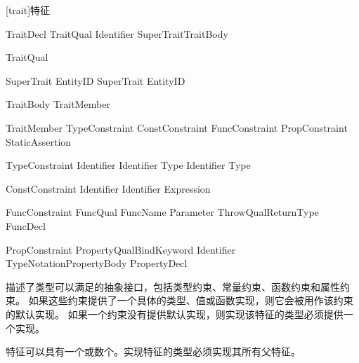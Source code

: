 
[trait]{特征}

\begin{bnf}{TraitDecl}
    TraitQual\bnfs {} Identifier SuperTrait\bnfq TraitBody
\end{bnf}

\begin{bnf}{TraitQual}
\end{bnf}

\begin{bnf}{SuperTrait}
    \terminal{:} EntityID \br
    SuperTrait \terminal{,} EntityID
\end{bnf}

\begin{bnf}{TraitBody}
    \terminal{\{} TraitMember\bnfs \terminal{\}}
\end{bnf}

\begin{bnf}{TraitMember}
    TypeConstraint \br
    ConstConstraint \br
    FuncConstraint \br
    PropConstraint \br
    StaticAssertion
\end{bnf}

\begin{bnf}{TypeConstraint}
     Identifier \terminal{;} \br
     Identifier \terminal{:} Type \terminal{;} \br
     Identifier \terminal{=} Type \terminal{;}
\end{bnf}

\begin{bnf}{ConstConstraint}
     Identifier \terminal{;} \br
     Identifier \terminal{=} Expression \terminal{;}
\end{bnf}

\begin{bnf}{FuncConstraint}
    FuncQual\bnfs {} FuncName Parameter ThrowQual\bnfq ReturnType \terminal{;} \br
    FuncDecl
\end{bnf}

\begin{bnf}{PropConstraint}
    PropertyQual\bnfs BindKeyword Identifier TypeNotation\bnfq PropertyBody \terminal{;} \br
    PropertyDecl
\end{bnf}

\pnum
{}描述了类型可以满足的抽象接口，包括类型约束、常量约束、函数约束和属性约束。
如果这些约束提供了一个具体的类型、值或函数实现，则它会被用作该约束的默认实现。
如果一个约束没有提供默认实现，则实现该特征的类型必须提供一个实现。

\pnum
特征可以具有一个或数个。实现特征的类型必须实现其所有父特征。